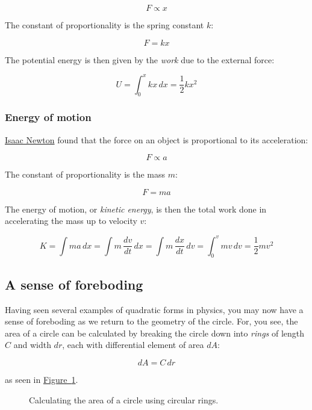 \documentclass{article}
\begin{document}
\[ F \propto x \]

\noindent The constant of proportionality is the spring constant $k$:

\[ F = k x \]

\noindent The potential energy is then given by the \emph{work} due to the external force:

\[ U = \int_0^x kx\,dx = \textstyle{\frac{1}{2}} kx^2 \]

    \subsubsection{Energy of motion} %
    \label{sec:energy_of_motion}

\href{http://en.wikipedia.org/wiki/Isaac_Newton}{Isaac Newton} found that the force on an object is proportional to its acceleration:

\[ F \propto a \]

\noindent The constant of proportionality is the mass $m$:

\[ F = m a \]

\noindent The energy of motion, or \emph{kinetic energy}, is then the total work done in accelerating the mass up to velocity $v$:

\[ K = \int ma\,dx = \int m\,\frac{dv}{dt}\,dx = \int m\, \frac{dx}{dt}\,dv = \int_0^v mv\,dv = \textstyle{\frac{1}{2}} mv^2 \]


  \subsection{A sense of foreboding} %
  \label{sec:a_sense_of_foreboding}

Having seen several examples of quadratic forms in physics, you may now have a sense of foreboding as we return to the geometry of the circle. For, you see, the area of a circle can be calculated by breaking the circle down into \emph{rings} of length $C$ and width $dr$, each with differential element of area $dA$:

\[ dA = C\,dr \]

\noindent as seen in \hyperref[fig:circular-area]{Figure~}\ref{fig:circular-area}.


\begin{figure}
\begin{center}
\end{center}
\caption{Calculating the area of a circle using circular rings.\label{fig:circular-area}}
\end{figure}
\end{document}
